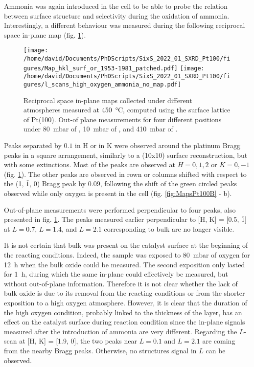 Ammonia was again introduced in the cell to be able to probe the relation between surface structure and selectivity during the oxidation of ammonia.
Interestingly, a different behaviour was measured during the following reciprocal space in-plane map (fig. \ref{fig:MapsAndLScansPt100HighOxAmmonia}).

\begin{figure}[!htb]
    \centering
    \texttt{[image: /home/david/Documents/PhDScripts/SixS\_2022\_01\_SXRD\_Pt100/figures/Map\_hkl\_surf\_or\_1953-1981\_patched.pdf]}
    \texttt{[image: /home/david/Documents/PhDScripts/SixS\_2022\_01\_SXRD\_Pt100/figures/l\_scans\_high\_oxygen\_ammonia\_no\_map.pdf]}
    \caption{
        Reciprocal space in-plane maps collected under different atmospheres measured at \qty{450}{\degreeCelsius}, computed using the surface lattice of Pt(100).
        Out-of plane measurements for four different positions under \qty{80}{\milli\bar} of , \qty{10}{\milli\bar} of , and \qty{410}{\milli\bar} of .
    }
    \label{fig:MapsAndLScansPt100HighOxAmmonia}
\end{figure}

Peaks separated by $0.1$ in H or in K were observed around the platinum Bragg peaks in a square arrangement, similarly to a (10x10) surface reconstruction, but with some extinctions.
Most of the peaks are observed at $H={0,1,2}$ or $K={0, -1}$ (fig. \ref{fig:MapsAndLScansPt100HighOxAmmonia}).
The other peaks are observed in rown or columns shifted with respect to the (1, $\bar{1}$, 0) Bragg peak by $0.09$, following the shift of the green circled peaks observed while only oxygen is present in the cell (fig. \ref{fig:MapsPt100B} - b).

Out-of-plane measurements were performed perpendicular to four peaks, also presented in fig. \ref{fig:MapsAndLScansPt100HighOxAmmonia}.
The peaks measured earlier perpendicular to [H, K] = [0.5, $\bar{1}$] at $L=0.7$, $L=1.4$, and $L=2.1$ corresponding to bulk  are no longer visible.

It is not certain that bulk  was present on the catalyst surface at the beginning of the reacting conditions.
Indeed, the sample was exposed to \qty{80}{\milli\bar} of oxygen for \qty{12}{\hour} when the bulk oxide could be measured.
The second exposition only lasted for \qty{1}{\hour}, during which the same in-plane could effectively be measured, but without out-of-plane information.
Therefore it is not clear whether the lack of bulk oxide is due to its removal from the reacting conditions or from the shorter exposition to a high oxygen atmosphere.
However, it is clear that the duration of the high oxygen condition, probably linked to the thickness of the  layer, has an effect on the catalyst surface during reaction condition since the in-plane signals measured after the introduction of ammonia are very different.
Regarding the $L$-scan at [H, K] = [1.9, 0], the two peaks near $L=0.1$ and $L=2.1$ are coming from the nearby Bragg peaks.
Otherwise, no structures signal in $L$ can be observed.

